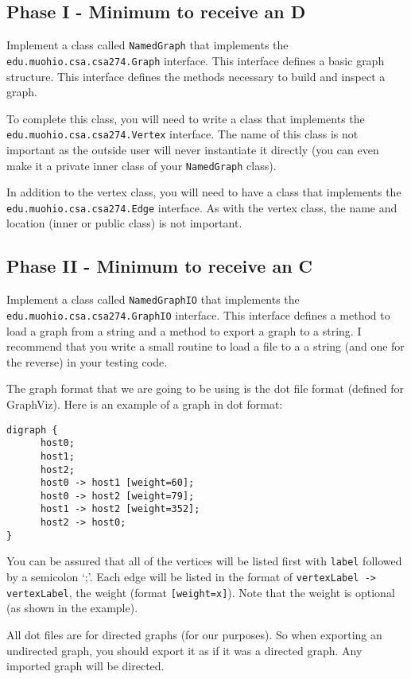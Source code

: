 \documentclass[11pt]{article}
\begin{document}
\subsection*{Phase I - Minimum to receive an D}
\par
Implement a class called {\tt NamedGraph} that implements the {\tt edu.muohio.csa.csa274.Graph} interface.  This interface defines a basic graph structure.   This interface defines the methods necessary to build and inspect a graph.
\par
To complete this class, you will need to write a class that implements the {\tt edu.muohio.csa.csa274.Vertex} interface.   The name of this class is not important as the outside user will never instantiate it directly (you can even make it a private inner class of your {\tt NamedGraph} class).
\par
In addition to the vertex class, you will need to have a class that implements the {\tt edu.muohio.csa.csa274.Edge} interface.   As with the vertex class, the name and location (inner or public class) is not important. 

\subsection*{Phase II - Minimum to receive an C}
\par
Implement a class called {\tt NamedGraphIO} that implements the {\tt edu.muohio.csa.csa274.GraphIO} interface.   This interface defines a method to load a graph from a string and a method to export a graph to a string.   I recommend that you write a small routine to load a file to a a string (and one for the reverse) in your testing code.
\par
The graph format that we are going to be using is the dot file format (defined for GraphViz).   Here is an example of a graph in dot format:
\begin{verbatim}
digraph {
	  host0;
	  host1;
	  host2;
	  host0 -> host1 [weight=60];
	  host0 -> host2 [weight=79];
	  host1 -> host2 [weight=352];
	  host2 -> host0;
}
\end{verbatim}

You can be assured that all of the vertices will be listed first with {\tt label} followed by a semicolon `;'.  Each edge will be listed in the format of {\tt vertexLabel -> vertexLabel}, the weight (format {\tt [weight=x]}).   Note that the weight is optional (as shown in the example).  
\par
All dot files are for directed graphs (for our purposes).   So when exporting an undirected graph, you should export it as if it was a directed graph.  Any imported graph will be directed.
\end{document}
